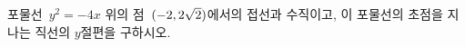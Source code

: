 포물선~$y^2=-4x$ 위의 점~$(-2{,}\mkern3mu\mathopen{}2\sqrt{2})$에서의 접선과 수직이고, 이 포물선의 초점을 지나는 직선의 $y$절편을 구하시오.
